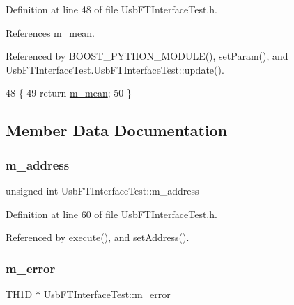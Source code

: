 Definition at line 48 of file Usb\+F\+T\+Interface\+Test.\+h.



References m\+\_\+mean.



Referenced by B\+O\+O\+S\+T\+\_\+\+P\+Y\+T\+H\+O\+N\+\_\+\+M\+O\+D\+U\+L\+E(), set\+Param(), and Usb\+F\+T\+Interface\+Test.\+Usb\+F\+T\+Interface\+Test\+::update().


\begin{DoxyCode}
48                 \{
49     \textcolor{keywordflow}{return} \hyperlink{classUsbFTInterfaceTest_a88bd9de98a903663a21e03368aa567fc}{m\_mean};
50   \}
\end{DoxyCode}


\subsection{Member Data Documentation}
\mbox{\label{classUsbFTInterfaceTest_afab3cfd8e2bba2621583f0631471ef12}} 
\subsubsection{\texorpdfstring{m\+\_\+address}{m\_address}}
{\footnotesize\ttfamily unsigned int Usb\+F\+T\+Interface\+Test\+::m\+\_\+address\hspace{0.3cm}{\ttfamily [private]}}



Definition at line 60 of file Usb\+F\+T\+Interface\+Test.\+h.



Referenced by execute(), and set\+Address().

\mbox{\label{classUsbFTInterfaceTest_ac4efb68232e7acdf1b87278aabfbf1a6}} 
\subsubsection{\texorpdfstring{m\+\_\+error}{m\_error}}
{\footnotesize\ttfamily T\+H1D $\ast$ Usb\+F\+T\+Interface\+Test\+::m\+\_\+error\hspace{0.3cm}{\ttfamily [private]}}



